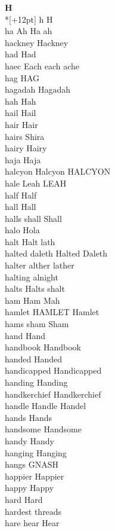 \vspace{14pt}
\noindent\textbf{\Large H}\\*[+12pt]
h H\\
ha Ah Ha ah\\
hackney Hackney\\
had Had\\
haec Each each ache\\
hag HAG\\
hagadah Hagadah\\
hah Hah\\
hail Hail\\
hair Hair\\
hairs Shira\\
hairy Hairy\\
haja Haja\\
halcyon Halcyon HALCYON\\
hale Leah LEAH\\
half Half\\
hall Hall\\
halls shall Shall\\
halo Hola\\
halt Halt lath\\
halted daleth Halted Daleth\\
halter alther lather\\
halting alnight\\
halts Halts shalt\\
ham Ham Mah\\
hamlet HAMLET Hamlet\\
hams sham Sham\\
hand Hand\\
handbook Handbook\\
handed Handed\\
handicapped Handicapped\\
handing Handing\\
handkerchief Handkerchief\\
handle Handle Handel\\
hands Hands\\
handsome Handsome\\
handy Handy\\
hanging Hanging\\
hangs GNASH\\
happier Happier\\
happy Happy\\
hard Hard\\
hardest threads\\
hare hear Hear\\
